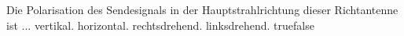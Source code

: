     {Die Polarisation des Sendesignals in der Hauptstrahlrichtung dieser Richtantenne ist ...}
    {vertikal.}
    {horizontal.}
    {rechtsdrehend.}
    {linksdrehend.}
    {true}{false}